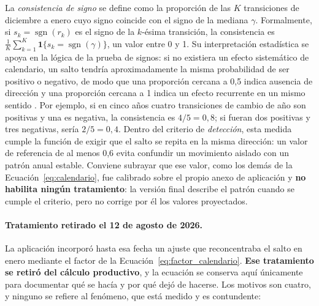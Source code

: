 \documentclass[12pt,letterpaper]{article}
\providecommand{\parencite}{\citep}
\begin{document}
La \emph{consistencia de signo} se define como la proporción de las \(K\) transiciones de diciembre a enero cuyo signo coincide con el signo de la mediana \(\gamma\). Formalmente, si \(s_k=\operatorname{sgn}(r_k)\) es el signo de la \(k\)-ésima transición, la consistencia es \(\tfrac{1}{K}\sum_{k=1}^{K}\mathbf{1}\{s_k=\operatorname{sgn}(\gamma)\}\), un valor entre 0 y 1. Su interpretación estadística se apoya en la lógica de la prueba de signos: si no existiera un efecto sistemático de calendario, un salto tendría aproximadamente la misma probabilidad de ser positivo o negativo, de modo que una proporción cercana a 0,5 indica ausencia de dirección y una proporción cercana a 1 indica un efecto recurrente en un mismo sentido \parencite{nist_eda_summary}. Por ejemplo, si en cinco años cuatro transiciones de cambio de año son positivas y una es negativa, la consistencia es \(4/5=0{,}8\); si fueran dos positivas y tres negativas, sería \(2/5=0{,}4\). Dentro del criterio de \emph{detección}, esta medida cumple la función de exigir que el salto se repita en la misma dirección: un valor de referencia de al menos 0{,}6 evita confundir un movimiento aislado con un patrón anual estable. Conviene subrayar que ese valor, como los demás de la Ecuación~\ref{eq:calendario}, fue calibrado sobre el propio anexo de aplicación y \textbf{no habilita ningún tratamiento}: la versión final describe el patrón cuando se cumple el criterio, pero no corrige por él los valores proyectados.

\paragraph{Tratamiento retirado el 12 de agosto de 2026.} La aplicación
incorporó hasta esa fecha un ajuste que reconcentraba el salto en enero mediante
el factor de la Ecuación~\ref{eq:factor_calendario}. \textbf{Ese tratamiento se
retiró del cálculo productivo}, y la ecuación se conserva aquí únicamente para
documentar qué se hacía y por qué dejó de hacerse. Los motivos son cuatro, y
ninguno se refiere al fenómeno, que está medido y es contundente:
\end{document}
